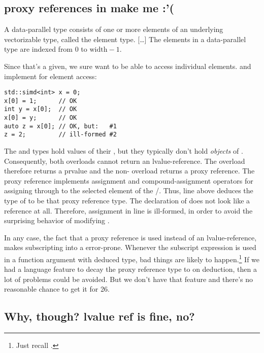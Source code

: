 \subsection{proxy references in \CC{} make me :'(}
\begin{wgText}
  A data-parallel type consists of one or more elements of an underlying
  vectorizable type, called the element type.
  [\ldots]
  The elements in a data-parallel type are indexed from 0 to $\mathrm{width} - 1$.
\end{wgText}

Since that's a given, we sure want to be able to access individual elements.
\simd and \mask implement  for element access:

\medskip\begin{lstlisting}[style=Vc]
std::simd<int> x = 0;
x[0] = 1;      // OK
int y = x[0];  // OK
x[0] = y;      // OK
auto z = x[0]; // OK, but:   #1
z = 2;         // ill-formed #2
\end{lstlisting}

The \simd and \mask types hold values of their , but they typically
don't hold \emph{objects} of .
Consequently, both  overloads cannot return an
lvalue-reference.
The  overload therefore returns a prvalue and the non-
overload returns a proxy reference.
The proxy reference implements assignment and compound-assignment operators for
assigning through to the selected element of the \simd/\mask.
Thus, line  above deduces the type of  to be that proxy
reference type.
The declaration of  does not look like a reference at all.
Therefore, assignment in line  is ill-formed, in order to avoid
the surprising behavior of modifying .

In any case, the fact that a proxy reference is used instead of an
lvalue-reference, makes subscripting into a  error-prone.
Whenever the subscript expression is used in a function argument with deduced
type, bad things are likely to happen.\footnote{Just recall
.}
If we had a language feature to decay the proxy reference type to  on
deduction, then a lot of problems could be avoided.
But we don't have that feature and there's no reasonable chance to get it for
\CC{}26.

\subsection{Why, though? lvalue ref is fine, no?}

